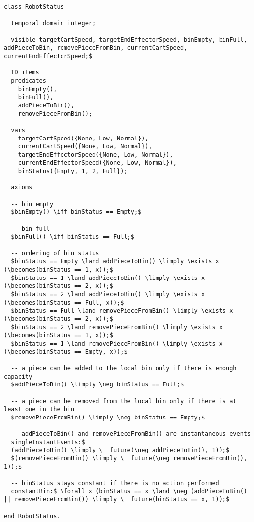 \begin{lstlisting}[fontadjust, mathescape, frame=single] 
class RobotStatus

  temporal domain integer;

  visible targetCartSpeed, targetEndEffectorSpeed, binEmpty, binFull, addPieceToBin, removePieceFromBin, currentCartSpeed, currentEndEffectorSpeed;$

  TD items
  predicates
    binEmpty(),
    binFull(),
    addPieceToBin(),
    removePieceFromBin();

  vars
    targetCartSpeed({None, Low, Normal}),
    currentCartSpeed({None, Low, Normal}),
    targetEndEffectorSpeed({None, Low, Normal}),
    currentEndEffectorSpeed({None, Low, Normal}),
    binStatus({Empty, 1, 2, Full});

  axioms

  -- bin empty
  $binEmpty() \iff binStatus == Empty;$

  -- bin full
  $binFull() \iff binStatus == Full;$

  -- ordering of bin status
  $binStatus == Empty \land addPieceToBin() \limply \exists x (\becomes(binStatus == 1, x));$
  $binStatus == 1 \land addPieceToBin() \limply \exists x (\becomes(binStatus == 2, x));$
  $binStatus == 2 \land addPieceToBin() \limply \exists x (\becomes(binStatus == Full, x));$
  $binStatus == Full \land removePieceFromBin() \limply \exists x (\becomes(binStatus == 2, x));$
  $binStatus == 2 \land removePieceFromBin() \limply \exists x (\becomes(binStatus == 1, x));$
  $binStatus == 1 \land removePieceFromBin() \limply \exists x (\becomes(binStatus == Empty, x));$

  -- a piece can be added to the local bin only if there is enough capacity
  $addPieceToBin() \limply \neg binStatus == Full;$

  -- a piece can be removed from the local bin only if there is at least one in the bin
  $removePieceFromBin() \limply \neg binStatus == Empty;$

  -- addPieceToBin() and removePieceFromBin() are instantaneous events
  singleInstantEvents:$
  (addPieceToBin() \limply \  future(\neg addPieceToBin(), 1));$
  $(removePieceFromBin() \limply \  future(\neg removePieceFromBin(), 1));$

  -- binStatus stays constant if there is no action performed
  constantBin:$ \forall x (binStatus == x \land \neg (addPieceToBin() || removePieceFromBin()) \limply \  future(binStatus == x, 1));$

end RobotStatus.\end{lstlisting}